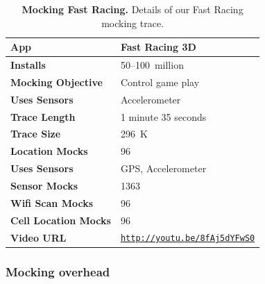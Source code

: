 \begin{table}[t]

\begin{tabularx}{3.33in}{lX}
\textbf{App} & Fast Racing 3D \\ \toprule
\textbf{Installs} & 50--100~million \\
  \textbf{Mocking Objective} & Control game play \\ \midrule
\textbf{Uses Sensors} & Accelerometer \\
\textbf{Trace Length} & 1 minute 35 seconds \\
\textbf{Trace Size} & 296~K \\
\textbf{Location Mocks} & 96 \\
\textbf{Uses Sensors} & GPS, Accelerometer \\
\textbf{Sensor Mocks} & 1363 \\
\textbf{Wifi Scan Mocks} & 96 \\
\textbf{Cell Location Mocks} & 96 \\
\textbf{Video URL} &
  \hyperlink{http://youtu.be/8fAj5dYFwS0}{\texttt{http://youtu.be/8fAj5dYFwS0}}
  \\

\end{tabularx}

\caption{\textbf{Mocking Fast Racing.} Details of our Fast Racing
  mocking trace.}

\label{table-mocking-game}
\vspace*{-0.2in}
\end{table}


\subsubsection{Mocking overhead}
\label{subsec-overhead}

